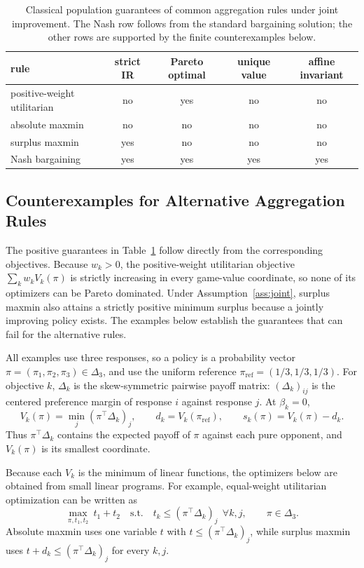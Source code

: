 \documentclass{article}
\theoremstyle{remark}
\theoremstyle{plain}
\newcommand{\piref}{\pi_{\mathrm{ref}}}
\begin{document}
\begin{table}[htbp]
\centering\footnotesize
\setlength{\tabcolsep}{4.2pt}
\caption{Classical population guarantees of common aggregation rules under joint improvement. The Nash row follows from the standard bargaining solution; the other rows are supported by the finite counterexamples below.}
\label{tab:rule-guarantees}
\begin{tabular}{lcccc}
\toprule
rule & strict IR & Pareto optimal & unique value & affine invariant\\
\midrule
positive-weight utilitarian & no & yes & no & no\\
absolute maxmin & no & no & no & no\\
surplus maxmin & yes & no & no & no\\
Nash bargaining & yes & yes & yes & yes\\
\bottomrule
\end{tabular}
\end{table}

\subsection{Counterexamples for Alternative Aggregation Rules}
\label{app:rule-witnesses}

The positive guarantees in Table~\ref{tab:rule-guarantees} follow
directly from the corresponding objectives. Because $w_k>0$, the
positive-weight utilitarian objective $\sum_k w_k V_k(\pi)$ is strictly
increasing in every game-value coordinate, so none of its optimizers can
be Pareto dominated. Under Assumption~\ref{ass:joint}, surplus maxmin
also attains a strictly positive minimum surplus because a jointly
improving policy exists. The examples below establish the guarantees
that can fail for the alternative rules.

All examples use three responses, so a policy is a probability vector
$\pi=(\pi_1,\pi_2,\pi_3)\in\Delta_3$, and use the uniform reference
$\piref=(1/3,1/3,1/3)$. For objective $k$, $\Delta_k$ is the skew-symmetric
pairwise payoff matrix: $(\Delta_k)_{ij}$ is the centered preference margin of response
$i$ against response $j$. At $\beta_k=0$,
\[
V_k(\pi)
=
\min_j(\pi^\top \Delta_k)_j,
\qquad
d_k=V_k(\piref),
\qquad
s_k(\pi)=V_k(\pi)-d_k.
\]
Thus $\pi^\top \Delta_k$ contains the expected payoff of $\pi$ against each
pure opponent, and $V_k(\pi)$ is its smallest coordinate.

Because each $V_k$ is the minimum of linear functions, the optimizers
below are obtained from small linear programs. For example,
equal-weight utilitarian optimization can be written as
\[
\max_{\pi,t_1,t_2}\ t_1+t_2
\quad\text{s.t.}\quad
t_k\le(\pi^\top \Delta_k)_j
\ \ \forall k,j,\qquad
\pi\in\Delta_3.
\]
Absolute maxmin uses one variable $t$ with
$t\le(\pi^\top \Delta_k)_j$, while surplus maxmin uses
$t+d_k\le(\pi^\top \Delta_k)_j$ for every $k,j$.
\end{document}
